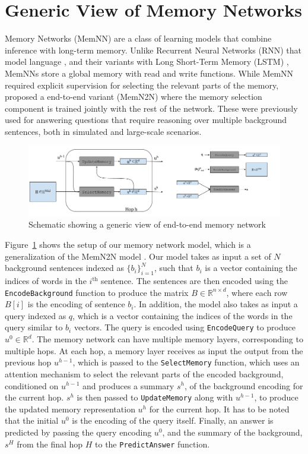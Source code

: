 \section{Generic View of Memory Networks}
Memory Networks (MemNN) \citep{weston2014memory} are a class of learning models
that combine inference with long-term memory. Unlike Recurrent Neural Networks
(RNN) that model language \citep{mikolov2010recurrent}, and their variants with
Long Short-Term Memory (LSTM) \citep{hochreiter1997long}, MemNNs store a global
memory with read and write functions. While MemNN required explicit supervision
for selecting the relevant parts of the memory, \citep{sukhbaatar2015end}
proposed a end-to-end variant (MemN2N) where the memory selection component is
trained jointly with the rest of the network. These were previously used for
answering questions that require reasoning over multiple background sentences,
both in simulated \citep{bordes2010towards} and large-scale
\citep{fader2013paraphrase} scenarios.
\begin{figure}
\begin{center}
  \includegraphics[width=6.5in]{figures/memory_network_generic.png}
  \caption{Schematic showing a generic view of end-to-end memory network}
  \label{fig:memnet}
  \end{center}
\end{figure}
Figure~\ref{fig:memnet} shows the setup of our memory network model, which is a
generalization of the MemN2N model \citep{sukhbaatar2015end}. Our model takes as
input a set of $N$ background sentences indexed as $\{b_i\}_{i=1}^N$, such that
$b_i$ is a vector containing the indices of words in the $i^\text{th}$ sentence.
The sentences are then encoded using the \texttt{EncodeBackground} function to
produce the matrix $B \in \mathbb{R}^{n \times d}$, where each row $B[i]$ is the
encoding of sentence $b_i$. In addition, the model also takes as input a query
indexed as $q$, which is a vector containing the indices of the words in the
query similar to $b_i$ vectors. The query is encoded using \texttt{EncodeQuery}
to produce $u^0 \in \mathbb{R}^d$. The memory network can have multiple memory
layers, corresponding to multiple hops. At each hop, a memory layer receives as
input the output from the previous hop $u^{h-1}$, which is passed to the
\texttt{SelectMemory} function, which uses an attention mechanism to select the
relevant parts of the encoded background, conditioned on $u^{h-1}$ and produces
a summary $s^h$, of the background encoding for the current hop. $s^h$ is then
passed to \texttt{UpdateMemory} along with $u^{h-1}$, to produce the updated
memory representation $u^h$ for the current hop. It has to be noted that the
initial $u^0$ is the encoding of the query itself. Finally, an answer is
predicted by passing the query encoding $u^0$, and the summary of the
background, $s^H$ from the final hop $H$ to the \texttt{PredictAnswer} function.

